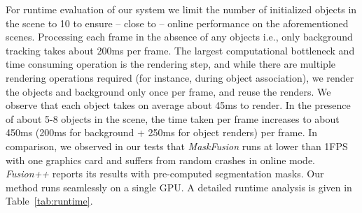 For runtime evaluation of our system we limit the number of initialized objects in the scene to 10 to ensure -- close to -- online performance on the aforementioned scenes. Processing each frame in the absence of any objects i.e., only background tracking takes about 200ms per frame. The largest computational bottleneck and time consuming operation is the rendering step, and while there are multiple rendering operations required (for instance, during object association), we render the objects and background only once per frame, and reuse the renders. We observe that each object takes on average about 45ms to render. In the presence of about 5-8 objects in the scene, the time taken per frame increases to about 450ms (200ms for background + 250ms for object renders) per frame. In comparison, we observed in our tests that \textit{MaskFusion} runs at lower than 1FPS with one graphics card and suffers from random crashes in online mode. \textit{Fusion++} reports its results with pre-computed segmentation masks. Our method runs seamlessly on a single GPU. A detailed runtime analysis is given in Table~\ref{tab:runtime}.

\begin{table}[ht]
    \centering
    \caption{Runtime breakdown component-wise for our pipeline}
    \label{tab:runtime}
\end{table}
